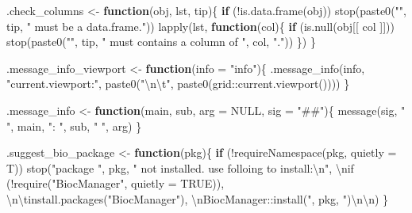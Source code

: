 \documentclass[
]{article}
\newenvironment{Shaded}{\begin{snugshade}}{\end{snugshade}}
\newcommand{\AttributeTok}[1]{\textcolor[rgb]{0.77,0.63,0.00}{#1}}
\newcommand{\ConstantTok}[1]{\textcolor[rgb]{0.00,0.00,0.00}{#1}}
\newcommand{\ControlFlowTok}[1]{\textcolor[rgb]{0.13,0.29,0.53}{\textbf{#1}}}
\newcommand{\FunctionTok}[1]{\textcolor[rgb]{0.00,0.00,0.00}{#1}}
\newcommand{\NormalTok}[1]{#1}
\newcommand{\OtherTok}[1]{\textcolor[rgb]{0.56,0.35,0.01}{#1}}
\newcommand{\SpecialCharTok}[1]{\textcolor[rgb]{0.00,0.00,0.00}{#1}}
\newcommand{\StringTok}[1]{\textcolor[rgb]{0.31,0.60,0.02}{#1}}
\begin{document}
\begin{Shaded}
\begin{Highlighting}[]
\NormalTok{.check\_columns }\OtherTok{\textless{}{-}} 
  \ControlFlowTok{function}\NormalTok{(obj, lst, tip)\{}
    \ControlFlowTok{if}\NormalTok{ (}\SpecialCharTok{!}\FunctionTok{is.data.frame}\NormalTok{(obj))}
      \FunctionTok{stop}\NormalTok{(}\FunctionTok{paste0}\NormalTok{(}\StringTok{"\textquotesingle{}"}\NormalTok{, tip, }\StringTok{"\textquotesingle{} must be a \textquotesingle{}data.frame\textquotesingle{}."}\NormalTok{))}
    \FunctionTok{lapply}\NormalTok{(lst, }\ControlFlowTok{function}\NormalTok{(col)\{}
      \ControlFlowTok{if}\NormalTok{ (}\FunctionTok{is.null}\NormalTok{(obj[[ col ]]))}
        \FunctionTok{stop}\NormalTok{(}\FunctionTok{paste0}\NormalTok{(}\StringTok{"\textquotesingle{}"}\NormalTok{, tip, }\StringTok{"\textquotesingle{} must contains a column of \textquotesingle{}"}\NormalTok{, col, }\StringTok{"\textquotesingle{}."}\NormalTok{))}
\NormalTok{      \})}
\NormalTok{  \}}

\NormalTok{.message\_info\_viewport }\OtherTok{\textless{}{-}} 
  \ControlFlowTok{function}\NormalTok{(}\AttributeTok{info =} \StringTok{"info"}\NormalTok{)\{}
    \FunctionTok{.message\_info}\NormalTok{(info, }\StringTok{"current.viewport:"}\NormalTok{,}
      \FunctionTok{paste0}\NormalTok{(}\StringTok{"}\SpecialCharTok{\textbackslash{}n\textbackslash{}t}\StringTok{"}\NormalTok{, }\FunctionTok{paste0}\NormalTok{(grid}\SpecialCharTok{::}\FunctionTok{current.viewport}\NormalTok{())))}
\NormalTok{  \}}

\NormalTok{.message\_info }\OtherTok{\textless{}{-}} 
  \ControlFlowTok{function}\NormalTok{(main, sub, }\AttributeTok{arg =} \ConstantTok{NULL}\NormalTok{, }\AttributeTok{sig =} \StringTok{"\#\#"}\NormalTok{)\{}
    \FunctionTok{message}\NormalTok{(sig, }\StringTok{" "}\NormalTok{, main, }\StringTok{": "}\NormalTok{, sub, }\StringTok{" "}\NormalTok{, arg)}
\NormalTok{  \}}

\NormalTok{.suggest\_bio\_package }\OtherTok{\textless{}{-}} 
  \ControlFlowTok{function}\NormalTok{(pkg)\{}
    \ControlFlowTok{if}\NormalTok{ (}\SpecialCharTok{!}\FunctionTok{requireNamespace}\NormalTok{(pkg, }\AttributeTok{quietly =}\NormalTok{ T))}
      \FunctionTok{stop}\NormalTok{(}\StringTok{"package \textquotesingle{}"}\NormalTok{, pkg, }\StringTok{"\textquotesingle{} not installed. use folloing to install:}\SpecialCharTok{\textbackslash{}n}\StringTok{"}\NormalTok{,}
        \StringTok{\textquotesingle{}}\SpecialCharTok{\textbackslash{}n}\StringTok{if (!require("BiocManager", quietly = TRUE))\textquotesingle{}}\NormalTok{,}
        \StringTok{\textquotesingle{}}\SpecialCharTok{\textbackslash{}n\textbackslash{}t}\StringTok{install.packages("BiocManager")\textquotesingle{}}\NormalTok{,}
        \StringTok{\textquotesingle{}}\SpecialCharTok{\textbackslash{}n}\StringTok{BiocManager::install("\textquotesingle{}}\NormalTok{, pkg, }\StringTok{\textquotesingle{}")}\SpecialCharTok{\textbackslash{}n\textbackslash{}n}\StringTok{\textquotesingle{}}\NormalTok{)}
\NormalTok{  \}}


\end{Highlighting}
\end{Shaded}
\end{document}
